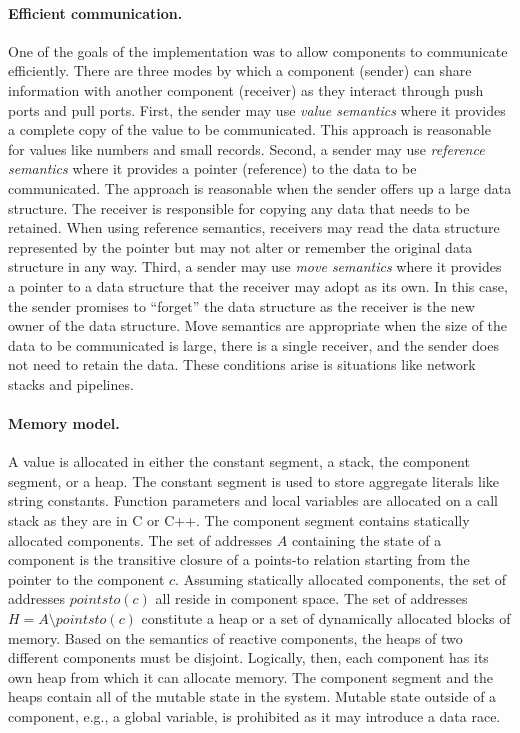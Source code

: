\paragraph{Efficient communication.}
One of the goals of the implementation was to allow components to communicate efficiently.
There are three modes by which a component (sender) can share information with another component (receiver) as they interact through push ports and pull ports.
First, the sender may use \emph{value semantics} where it provides a complete copy of the value to be communicated.
This approach is reasonable for values like numbers and small records.
Second, a sender may use \emph{reference semantics} where it provides a pointer (reference) to the data to be communicated.
The approach is reasonable when the sender offers up a large data structure.
The receiver is responsible for copying any data that needs to be retained.
When using reference semantics, receivers may read the data structure represented by the pointer but may not alter or remember the original data structure in any way.
Third, a sender may use \emph{move semantics} where it provides a pointer to a data structure that the receiver may adopt as its own.
In this case, the sender promises to ``forget'' the data structure as the receiver is the new owner of the data structure.
Move semantics are appropriate when the size of the data to be communicated is large, there is a single receiver, and the sender does not need to retain the data.
These conditions arise is situations like network stacks and pipelines.

\paragraph{Memory model.}
A value is allocated in either the constant segment, a stack, the component segment, or a heap.
The constant segment is used to store aggregate literals like string constants.
Function parameters and local variables are allocated on a call stack as they are in C or C++.
The component segment contains statically allocated components.
The set of addresses $A$ containing the state of a component is the transitive closure of a points-to relation starting from the pointer to the component $c$.
Assuming statically allocated components, the set of addresses $pointsto(c)$ all reside in component space.
The set of addresses $H = A \setminus pointsto(c)$ constitute a heap or a set of dynamically allocated blocks of memory.
Based on the semantics of reactive components, the heaps of two different components must be disjoint.
Logically, then, each component has its own heap from which it can allocate memory.
The component segment and the heaps contain all of the mutable state in the system.
Mutable state outside of a component, e.g., a global variable, is prohibited as it may introduce a data race.

